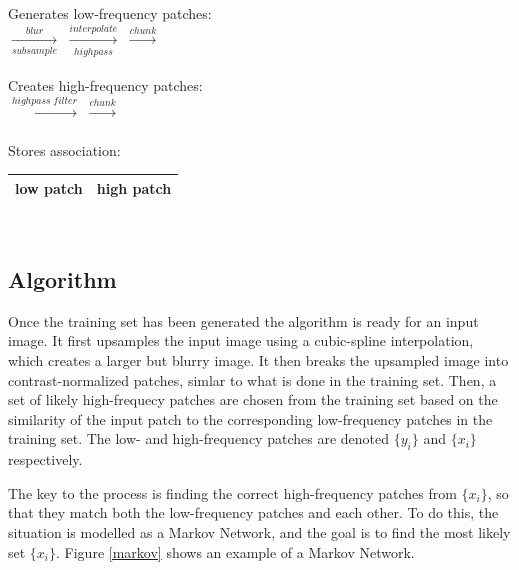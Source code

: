 \documentclass[a4paper]{article}
\begin{document}
\begin{center}
Generates low-frequency patches: \\
	 $\xrightarrow[subsample]{blur}$
	\framebox{\phantom{A}} $\xrightarrow[highpass]{interpolate}$ 
	 $\xrightarrow{chunk}$  \\ \ \\
Creates high-frequency patches: \\
	 $\xrightarrow{highpass\;filter}$
	  $\xrightarrow{chunk}$  \\ \ \\
Stores association: \\
	\begin{tabular}{| c | c |}
		\hline
		low patch &  high patch \\
		\hline
	\end{tabular} \\
\end{center}

\subsection{Algorithm}
Once the training set has been generated the algorithm is ready for an input image. It first upsamples the input image using a cubic-spline interpolation, which creates a larger but blurry image. It then breaks the upsampled image into contrast-normalized patches, simlar to what is done in the training set. Then, a set of likely high-frequecy patches are chosen from the training set based on the similarity of the input patch to the corresponding low-frequency patches in the training set. The low- and high-frequency patches are denoted $\{y_i\}$ and $\{x_i\}$ respectively.

The key to the process is finding the correct high-frequency patches from $\{x_i\}$, so that they match both the low-frequency patches and each other. To do this, the situation is modelled as a Markov Network, and the goal is to find the most likely set $\{x_i\}$. Figure \ref{markov} shows an example of a Markov Network.
\end{document}
